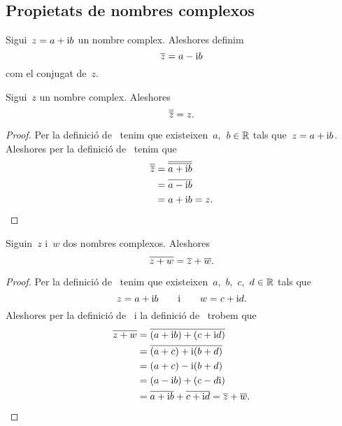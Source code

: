\documentclass[../Apunts.tex]{subfiles}
\begin{document}
	\subsection{Propietats de nombres complexos}
	\begin{definition}
		\label{def:conjugat d'un nombre complex}
		Sigui~\(z=a+\mathrm{i} b\) un nombre complex.
		Aleshores definim
		\[\overline{z}=a-\mathrm{i} b\]
		com el conjugat de~\(z\).
	\end{definition}
	\begin{proposition}
		\label{prop:el conjugat del conjugat d'un nombre complex és ell mateix}
		Sigui~\(z\) un nombre complex.
		Aleshores
		\[\overline{\overline{z}}=z.\]
	\end{proposition}
	\begin{proof}
		Per la definició de~ tenim que
		existeixen~\(a\),~\(b\in\mathbb{R}\) tals que~\(z=a+\mathrm{i} b\).
		Aleshores per la definició de~
		tenim que
		\begin{align*}
			\overline{\overline{z}}
			&=\overline{\overline{a+\mathrm{i} b}} \\
			&=\overline{a-\mathrm{i} b} \\
			&=a+\mathrm{i} b
			=z.
			\qedhere
		\end{align*}
	\end{proof}
	\begin{proposition}
		\label{prop:el conjugat de la suma és la suma de conjugats}
		Siguin~\(z\) i~\(w\) dos nombres complexos.
		Aleshores
		\[\overline{z+w}=\overline{z}+\overline{w}.\]
	\end{proposition}
	\begin{proof}
		Per la definició de~ tenim que
		existeixen~\(a\),~\(b\),~\(c\),~\(d\in\mathbb{R}\) tals que
		\[z=a+\mathrm{i} b\qquad\text{i}\qquad w=c+\mathrm{i} d.\]
		Aleshores per la definició de~
		i la definició de~ trobem que
		\begin{align*}
			\overline{z+w}
			&=\overline{(a+\mathrm{i} b)+(c+\mathrm{i} d)} \\
			&=\overline{(a+c)+\mathrm{i}(b+d)} \\
			&=(a+c)-\mathrm{i}(b+d) \\
			&=(a-\mathrm{i} b)+(c-d\mathrm{i}) \\
			&=\overline{a+\mathrm{i} b}+\overline{c+\mathrm{i} d}
			=\overline{z}+\overline{w}.
			\qedhere
		\end{align*}
	\end{proof}
\end{document}
